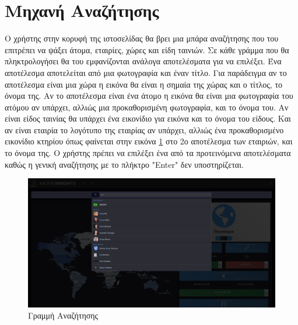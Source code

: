\section{Μηχανή Αναζήτησης}
Ο χρήστης στην κορυφή της ιστοσελίδας θα βρει μια μπάρα αναζήτησης που του επιτρέπει να ψάξει άτομα, εταιρίες, χώρες και είδη ταινιών. Σε κάθε γράμμα που θα πληκτρολογήσει θα του εμφανίζονται ανάλογα αποτελέσματα για να επιλέξει. Ένα αποτέλεσμα αποτελείται από μια φωτογραφία και έναν τίτλο. Για παράδειγμα αν το αποτέλεσμα είναι μια χώρα η εικόνα θα είναι η σημαία της χώρας και ο τίτλος, το όνομα της. Αν το αποτέλεσμα είναι ένα άτομο η εικόνα θα είναι μια φωτογραφία του ατόμου αν υπάρχει, αλλιώς μια προκαθορισμένη φωτογραφία, και το όνομα του. Αν είναι είδος ταινίας θα υπάρχει ένα εικονίδιο για εικόνα και το όνομα του είδους. Και αν είναι εταιρία το λογότυπο της εταιρίας αν υπάρχει, αλλιώς ένα προκαθορισμένο εικονίδιο κτηρίου όπως φαίνεται στην εικόνα \ref{demo:searchbar} στο 2ο αποτέλεσμα των εταιριών, και το όνομα της. Ο χρήστης πρέπει να επιλέξει ένα από τα προτεινόμενα αποτελέσματα καθώς η γενική αναζήτησης με το πλήκτρο "Enter" δεν υποστηρίζεται.

\begin{figure}[H]
  \centering
  \includegraphics[width=145mm]{Chapters/6 - Manual/Images/main_page_searchbar.png}
  \caption{Γραμμή Αναζήτησης}
  \label{demo:searchbar}
\end{figure}